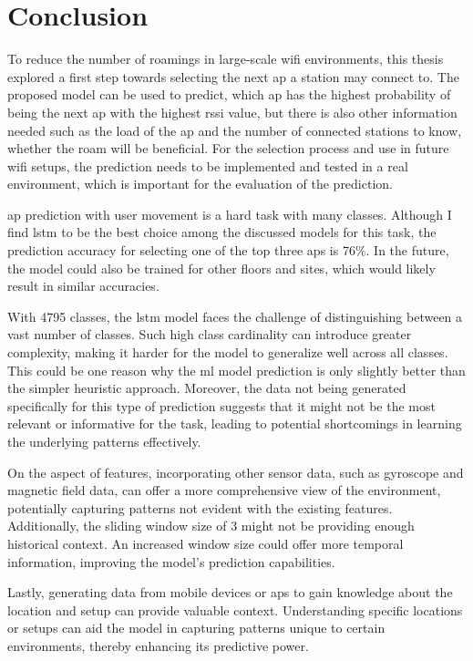 \chapter{Conclusion}\label{ch:conclusion}
 
To reduce the number of roamings in large-scale \ac{wifi} environments, this thesis explored a first step towards selecting the next \ac{ap} a station may connect to.
The proposed model can be used to predict, which \ac{ap} has the highest probability of being the next \ac{ap} with the highest \ac{rssi} value, but there is also other information needed such as the load of the \ac{ap} and the number of connected stations to know, whether the roam will be beneficial.
For the selection process and use in future \ac{wifi} setups, the prediction needs to be implemented and tested in a real environment, which is important for the evaluation of the prediction.

\ac{ap} prediction with user movement is a hard task with many classes.
Although I find \ac{lstm} to be the best choice among the discussed models for this task, the prediction accuracy for selecting one of the top three \acp{ap} is 76\%.
In the future, the model could also be trained for other floors and sites, which would likely result in similar accuracies.

With 4795 classes, the \ac{lstm} model faces the challenge of distinguishing between a vast number of classes.
Such high class cardinality can introduce greater complexity, making it harder for the model to generalize well across all classes.
This could be one reason why the \ac{ml} model prediction is only slightly better than the simpler heuristic approach.
Moreover, the data not being generated specifically for this type of prediction suggests that it might not be the most relevant or informative for the task, leading to potential shortcomings in learning the underlying patterns effectively.

On the aspect of features, incorporating other sensor data, such as gyroscope and magnetic field data, can offer a more comprehensive view of the environment, potentially capturing patterns not evident with the existing features.
Additionally, the sliding window size of 3 might not be providing enough historical context. An increased window size could offer more temporal information, improving the model's prediction capabilities.

Lastly, generating data from mobile devices or \acp{ap} to gain knowledge about the location and setup can provide valuable context.
Understanding specific locations or setups can aid the model in capturing patterns unique to certain environments, thereby enhancing its predictive power.
